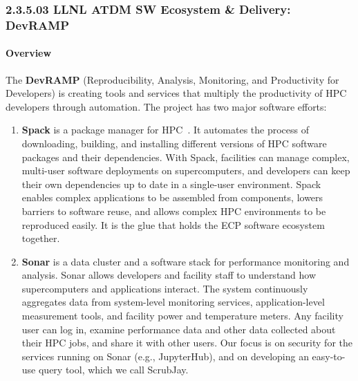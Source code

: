 \subsubsection{2.3.5.03 LLNL ATDM SW Ecosystem \& Delivery: DevRAMP}

\paragraph{Overview}
The {\bf DevRAMP} (Reproducibility, Analysis, Monitoring, and Productivity
for Developers) is creating tools and services that multiply the
productivity of HPC developers through automation. The project has two
major software efforts:

\begin{enumerate}
    \item {\bf Spack} is a package manager for
    HPC~\cite{melara+:cug17,gamblin+:sc17-spack-tutorial,gamblin+:sc16-spack-tutorial,gamblin+:sc15,gamblin+:llnl-spack-tutorial-17,gamblin+:ecp18-spack-tutorial,gamblin:pp18-spack,gamblin:hpckp17,gamblin:fosdem18-compilers,gamblin:fosdem18-binary,gamblin:ecp18-spack-sotu,gamblin:eb-user-meeting18,becker+:hust16}. It
    automates the process of downloading, building, and installing
    different versions of HPC software packages and their dependencies.
    With Spack, facilities can manage complex, multi-user software
    deployments on supercomputers, and developers can keep their own
    dependencies up to date in a single-user environment. Spack enables
    complex applications to be assembled from components, lowers barriers
    to software reuse, and allows complex HPC environments to be
    reproduced easily. It is the glue that holds the ECP software
    ecosystem together.

    \item {\bf Sonar} is a data cluster and a software stack for
    performance monitoring and analysis. Sonar allows developers and
    facility staff to understand how supercomputers and applications
    interact. The system continuously aggregates data from system-level
    monitoring services, application-level measurement tools, and
    facility power and temperature meters.  Any facility user can log in,
    examine performance data and other data collected about their HPC
    jobs, and share it with other users. Our focus is on security for the
    services running on Sonar (e.g., JupyterHub), and on developing an
    easy-to-use query tool, which we call ScrubJay.
\end{enumerate}


